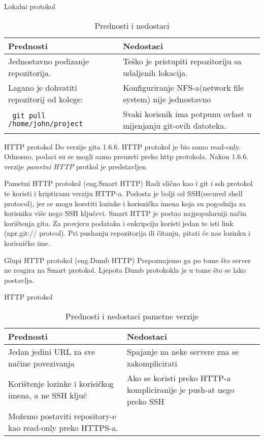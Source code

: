 \documentclass[10pt]{beamer}
\begin{document}
	\begin{frame}{Lokalni protokol}
		\begin{table}
			\caption{Prednosti i nedostaci}
			\begin{tabular}{||p{130pt}|p{130pt}||}
				\hline
				\textbf{Prednosti} & \textbf{Nedostaci} \\ \hline
				Jednostavno podizanje repozitorija. & Teško je pristupiti repozitoriju 	sa udaljenih lokacija. \\
				Lagano je dohvatiti repozitorij od kolege: & Konfiguriranje NFS-a(network file system) nije jednostavno\\ \texttt{ git pull /home/john/project}  & Svaki korisnik ima potpunu ovlast u mijenjanju git-ovih datoteka. \\
				\hline
			\end{tabular}
		\end{table}

	\end{frame}
	\begin{frame}{HTTP protokol}
		Do verzije gita 1.6.6. HTTP protokol je bio samo read-only. Odnosno, podaci su se mogli samo preuzeti preko http protokola.
		Nakon 1.6.6. verzije \textit{pametni HTTP} protkol je predstavljen 
		
	\end{frame}
	\begin{frame}{Pametni HTTP protokol (eng.Smart HTTP)}
		Radi slično kao i git i ssh protokol te koristi i kriptiranu verziju HTTP-a.
		Podosta je bolji od SSH(secured shell protocol), jer se mogu korstiti  lozinke i korisnička imena koja su pogodnija za korisnika više nego SSH ključevi. \newline
		Smart HTTP je postao najpopularniji način korištenja gita. Za provjeru podataka i enkripciju koristi jedan te isti link (npr.git:// protcol).
		Pri pushanju repozitorija ili čitanju, pitati će nas lozinku i korisničko ime.
	\end{frame}
	\begin{frame}{Glupi HTTP protokol (eng.Dumb HTTP)}
		Prepoznajemo ga po tome što server ne reagira na Smart protokol.
		Ljepota Dumb protokokla je u tome što se lako postavlja.
	\end{frame}
	\begin{frame}{HTTP protokol}
	\begin{table}
			\caption{Prednosti i nedostaci pametne verzije}
			\begin{tabular}{||p{130pt}|p{130pt}||}
				\hline
				\textbf{Prednosti} & \textbf{Nedostaci} \\ \hline
				Jedan jedini URL za sve načine povezivanja & Spajanje na neke servere zna se zakomplicirati \\
				Korištenje lozinke i korisičkog imena, a ne SSH ključ & Ako se koristi preko HTTP-a kompliciranije je push-at nego preko SSH\\  
				Možemo postaviti repository-e kao read-only preko HTTPS-a. & \\
				\hline
			\end{tabular}
		\end{table}
	\end{frame}
\end{document}
